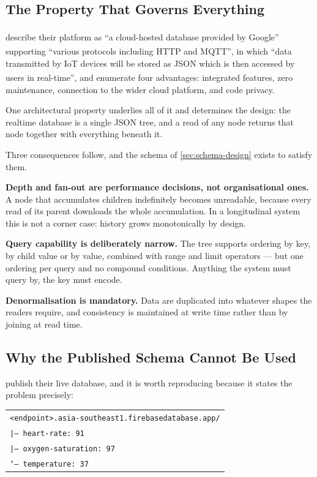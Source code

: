 \documentclass[12pt,a4paper,oneside]{report}
\newcommand{\bq}[1]{``#1''\textsuperscript{\dag}}
\begin{document}
\subsection{The Property That Governs Everything}\label{sec:tree-property}

\Textcite{efendi2025} describe their platform as \bq{a cloud-hosted database provided by Google} supporting \bq{various protocols including HTTP and MQTT}, in which \bq{data transmitted by IoT devices will be stored as JSON which is then accessed by users in real-time}, and enumerate four advantages: integrated features, zero maintenance, connection to the wider cloud platform, and code privacy.

One architectural property underlies all of it and determines the design: the realtime database is a single JSON tree, and a read of any node returns that node together with everything beneath it.

Three consequences follow, and the schema of \cref{sec:schema-design} exists to satisfy them.

\textbf{Depth and fan-out are performance decisions, not organisational ones.} A node that accumulates children indefinitely becomes unreadable, because every read of its parent downloads the whole accumulation. In a longitudinal system this is not a corner case: history grows monotonically by design.

\textbf{Query capability is deliberately narrow.} The tree supports ordering by key, by child value or by value, combined with range and limit operators --- but one ordering per query and no compound conditions. Anything the system must query by, the key must encode.

\textbf{Denormalisation is mandatory.} Data are duplicated into whatever shapes the readers require, and consistency is maintained at write time rather than by joining at read time.

\subsection{Why the Published Schema Cannot Be Used}\label{sec:schema-counterexample}

\Textcite{efendi2025} publish their live database, and it is worth reproducing because it states the problem precisely:

\begin{center}\small
\begin{tabular}{@{}l@{}}
\texttt{<endpoint>.asia-southeast1.firebasedatabase.app/} \\
\quad\texttt{|-- heart-rate: 91} \\
\quad\texttt{|-- oxygen-saturation: 97} \\
\quad\texttt{`-- temperature: 37} \\
\end{tabular}
\end{center}
\end{document}
